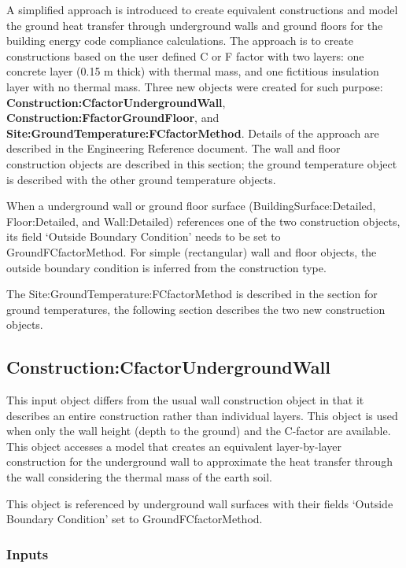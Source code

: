 A simplified approach is introduced to create equivalent constructions and model the ground heat transfer through underground walls and ground floors for the building energy code compliance calculations. The approach is to create constructions based on the user defined C or F factor with two layers: one concrete layer (0.15 m thick) with thermal mass, and one fictitious insulation layer with no thermal mass. Three new objects were created for such purpose: \textbf{Construction:CfactorUndergroundWall}, \textbf{Construction:FfactorGroundFloor}, and \textbf{Site:GroundTemperature:FCfactorMethod}. Details of the approach are described in the Engineering Reference document. The wall and floor construction objects are described in this section; the ground temperature object is described with the other ground temperature objects.

When a underground wall or ground floor surface (BuildingSurface:Detailed, Floor:Detailed, and Wall:Detailed) references one of the two construction objects, its field `Outside Boundary Condition' needs to be set to GroundFCfactorMethod. For simple (rectangular) wall and floor objects, the outside boundary condition is inferred from the construction type.

The Site:GroundTemperature:FCfactorMethod is described in the section for ground temperatures, the following section describes the two new construction objects.

\subsection{Construction:CfactorUndergroundWall}\label{constructioncfactorundergroundwall}

This input object differs from the usual wall construction object in that it describes an entire construction rather than individual layers. This object is used when only the wall height (depth to the ground) and the C-factor are available.~ This object accesses a model that creates an equivalent layer-by-layer construction for the underground wall to approximate the heat transfer through the wall considering the thermal mass of the earth soil.

This object is referenced by underground wall surfaces with their fields `Outside Boundary Condition' set to GroundFCfactorMethod.

\subsubsection{Inputs}\label{inputs-36}

